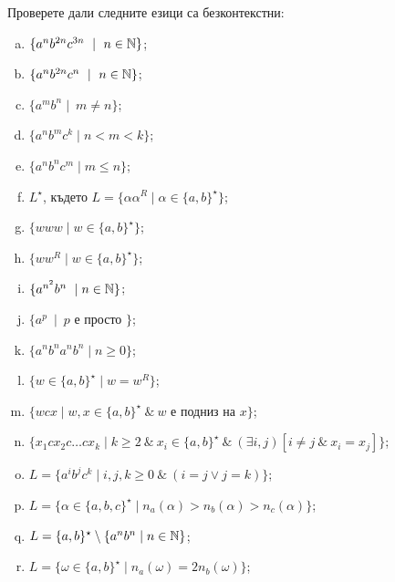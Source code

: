 \begin{problem}
  Проверете дали следните езици са безконтекстни:
  \begin{enumerate}[a)]
  \item
    $\{a^nb^{2n}c^{3n}\ \mid\ n\in\Nat\}$;
  \item
    $\{a^nb^{2n}c^{n}\ \mid\ n\in\Nat\}$;
  \item
    $\{a^mb^n\mid\ m \neq n\}$;
  \item
    $\{a^nb^mc^k\mid n < m < k\}$;
  \item
    $\{a^nb^nc^m\mid m \leq n\}$;
  \item
    $L^\star$, където
    $L = \{\alpha\alpha^R \mid \alpha \in \{a,b\}^\star\}$;
  \item
    $\{www\mid w\in \{a,b\}^\star\}$;
  \item
    $\{ww^R\mid w\in \{a,b\}^\star\}$;
  \item
    $\{a^{n^2}b^n\ \mid n \in \mathbb{N}\}$;
  \item
    $\{a^p\ \mid\ p\mbox{ е просто }\}$;
  \item
    $\{a^nb^na^nb^n\mid n\geq 0\}$;
  \item
    $\{w \in \{a,b\}^\star \mid w = w^R\}$;
  \item
    $\{w c x\mid w,x\in \{a,b\}^\star\ \&\ w\mbox{ е подниз на }x\}$;
  \item
    $\{x_1 c x_2 c \dots c x_k\mid k\geq 2\ \&\ x_i\in\{a,b\}^\star\ \&\ (\exists i,j)[i \neq j\ \&\ x_i = x_j]\}$;
  \item
    $L = \{a^ib^jc^k\mid i,j,k\geq 0\ \&\ (i = j \vee j = k)\}$;
  \item
    $L = \{\alpha \in \{a,b,c\}^\star\mid n_a(\alpha) > n_b(\alpha) > n_c(\alpha)\}$;
  \item
    $L = \{a,b\}^\star \setminus \{a^nb^n\mid n\in \mathbb{N}\}$;
  \item
    $L = \{\omega \in \{a,b\}^\star \mid n_a(\omega) = 2n_b(\omega)\}$;
  \end{enumerate}
\end{problem}
